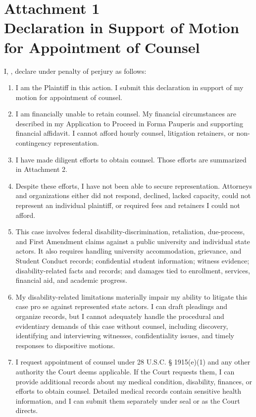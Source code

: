 \documentclass[12pt]{article}
\begin{document}
\newpage

\doublespacing
{}
{}%
\label{attachment:counsel-declaration}
\section*{Attachment 1\\Declaration in Support of Motion for Appointment of Counsel}

I, \FilingPlaintiffName, declare under penalty of perjury as follows:

\begin{enumerate}[leftmargin=2em]
    \item I am the Plaintiff in this action. I submit this declaration in support of my motion for appointment of counsel.

    \item I am financially unable to retain counsel. My financial circumstances are described in my Application to Proceed in Forma Pauperis and supporting financial affidavit. I cannot afford hourly counsel, litigation retainers, or non-contingency representation.

    \item I have made diligent efforts to obtain counsel. Those efforts are summarized in Attachment 2.

    \item Despite these efforts, I have not been able to secure representation. Attorneys and organizations either did not respond, declined, lacked capacity, could not represent an individual plaintiff, or required fees and retainers I could not afford.

    \item This case involves federal disability-discrimination, retaliation, due-process, and First Amendment claims against a public university and individual state actors. It also requires handling university accommodation, grievance, and Student Conduct records; confidential student information; witness evidence; disability-related facts and records; and damages tied to enrollment, services, financial aid, and academic progress.

    \item My disability-related limitations materially impair my ability to litigate this case pro se against represented state actors. I can draft pleadings and organize records, but I cannot adequately handle the procedural and evidentiary demands of this case without counsel, including discovery, identifying and interviewing witnesses, confidentiality issues, and timely responses to dispositive motions.

    \item I request appointment of counsel under 28 U.S.C. \S{} 1915(e)(1) and any other authority the Court deems applicable. If the Court requests them, I can provide additional records about my medical condition, disability, finances, or efforts to obtain counsel. Detailed medical records contain sensitive health information, and I can submit them separately under seal or as the Court directs.
\end{enumerate}
\end{document}
